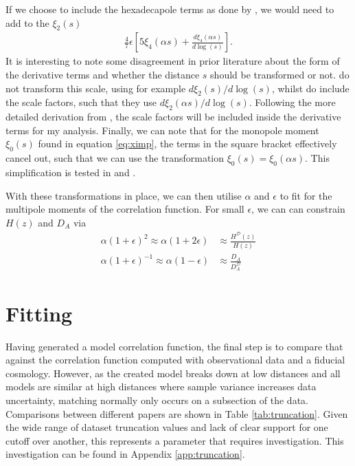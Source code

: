 \documentclass[titlesmallcaps, examinerscopy, copyrightpage]{uqthesis}
\begin{document}
If we choose to include the hexadecapole terms as done by \citet{XuCuesta2013}, we would need to add to the $\xi_2(s)$ 
\begin{align}
\frac{4}{7}\epsilon \left[ 5 \xi_4 (\alpha s) + \frac{d \xi_4(\alpha s)}{d \log(s)} \right].
\end{align}
It is interesting to note some disagreement in prior literature about the form of the derivative terms and whether the distance $s$ should be transformed or not. \citet{KazinSanchezBlanton2012} do not transform this scale, using for example $d\xi_2(s)/d\log(s)$, whilst \citet{XuCuesta2013} do include the scale factors, such that they use $d\xi_2(\alpha s) / d\log(s)$. Following the more detailed derivation from \citet{XuCuesta2013}, the scale factors will be included inside the derivative terms for my analysis. Finally, we can note that for the monopole moment $\xi_0(s)$ found in equation \eqref{eq:ximp}, the terms in the square bracket effectively cancel out, such that we can use the transformation $\xi_0(s) = \xi_0(\alpha s)$. This simplification is tested in \citet{Sanchez2009} and \citet{EisensteinZehavi2005}.

With these transformations in place, we can then utilise $\alpha$ and $\epsilon$ to fit for the multipole moments of the correlation function. For small $\epsilon$, we can can constrain $H(z)$ and $D_A$ via
\begin{align}
\alpha(1 + \epsilon)^2 \approx \alpha(1 + 2\epsilon) &\approx \frac{H^\mathcal{D}(z)}{H(z)} \label{eq:alpha1}\\
\alpha(1 + \epsilon)^{-1} \approx \alpha(1 - \epsilon) &\approx \frac{D_A}{D_A^\mathcal{D}} \label{eq:alpha2}
\end{align}



\newpage
\section{Fitting} \label{sec:trunc}

Having generated a model correlation function, the final step is to compare that against the correlation function computed with observational data and a fiducial cosmology. However, as the created model breaks down at low distances and all models are similar at high distances where sample variance increases data uncertainty, matching normally only occurs on a subsection of the data. Comparisons between different papers are shown in Table \ref{tab:truncation}. Given the wide range of dataset truncation values and lack of clear support for one cutoff over another, this represents a parameter that requires investigation. This investigation can be found in Appendix \ref{app:truncation}.
\end{document}
